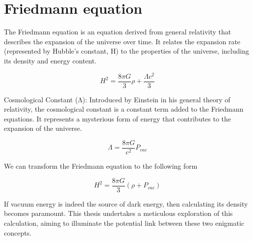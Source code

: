 \section{Friedmann equation}

The Friedmann equation is an equation derived from general relativity that describes the expansion of the universe over time. It relates the expansion rate (represented by Hubble's constant, H) to the properties of the universe, including its density and energy content.

\[ H^2 = \frac{8 \pi G}{3} \rho + \frac{\Lambda c^2}{3} \]

Cosmological Constant (Λ): Introduced by Einstein in his general theory of relativity, the cosmological constant is a constant term added to the Friedmann equations. It represents a mysterious form of energy that contributes to the expansion of the universe.

\[ \Lambda = \frac{8 \pi G}{c^2} P_{vac} \]

We can transform the Friedmann equation to the following form

\[ H^2 = \frac{8 \pi G}{3}(\rho + P_{vac}) \]

If vacuum energy is indeed the source of dark energy, then calculating its density becomes paramount. This thesis undertakes a meticulous exploration of this calculation, aiming to illuminate the potential link between these two enigmatic concepts.